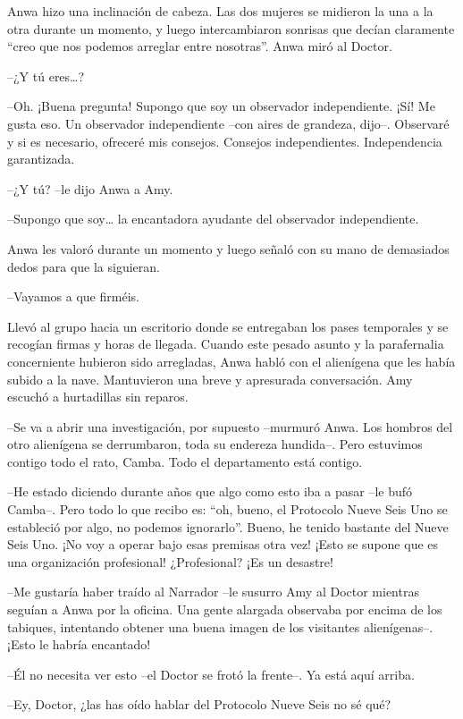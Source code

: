 {Anwa hizo una inclinación de cabeza. Las dos mujeres se midieron la una
	a la otra durante un momento, y luego intercambiaron sonrisas que decían
	claramente ``creo que nos podemos arreglar entre nosotras''. Anwa miró
al Doctor.}

{--¿Y tú eres\ldots{}?}

{--Oh. ¡Buena pregunta! Supongo que soy un observador independiente.
	¡Sí! Me gusta eso. Un observador independiente --con aires de grandeza,
	dijo--. Observaré y si es necesario, ofreceré mis consejos. Consejos
independientes. Independencia garantizada.}

{--¿Y tú? --le dijo Anwa a Amy.}

{--Supongo que soy\ldots{} la encantadora ayudante del observador
independiente.}

{Anwa les valoró durante un momento y luego señaló con su mano de
demasiados dedos para que la siguieran.}

{--Vayamos a que firméis.}

{Llevó al grupo hacia un escritorio donde se entregaban los pases
	temporales y se recogían firmas y horas de llegada. Cuando este pesado
	asunto y la parafernalia concerniente hubieron sido arregladas, Anwa
	habló con el alienígena que les había subido a la nave. Mantuvieron una
breve y apresurada conversación. Amy escuchó a hurtadillas sin reparos.}

{--Se va a abrir una investigación, por supuesto --murmuró Anwa. Los
	hombros del otro alienígena se derrumbaron, toda su endereza hundida--.
	Pero estuvimos contigo todo el rato, Camba. Todo el departamento está
contigo.}

{--He estado diciendo durante años que algo como esto iba a pasar --le
	bufó Camba--. Pero todo lo que recibo es: ``oh, bueno, el Protocolo
	Nueve Seis Uno se estableció por algo, no podemos ignorarlo''. Bueno, he
	tenido bastante del Nueve Seis Uno. ¡No voy a operar bajo esas premisas
	otra vez! ¡Esto se supone que es una organización profesional!
¿Profesional? ¡Es un desastre!}

{--Me gustaría haber traído al Narrador --le susurro Amy al Doctor
	mientras seguían a Anwa por la oficina. Una gente alargada observaba por
	encima de los tabiques, intentando obtener una buena imagen de los
visitantes alienígenas--. ¡Esto le habría encantado!}

{--Él no necesita ver esto --el Doctor se frotó la frente--. Ya está
aquí arriba.}

{--Ey, Doctor, ¿las has oído hablar del Protocolo Nueve Seis no sé
qué?}

